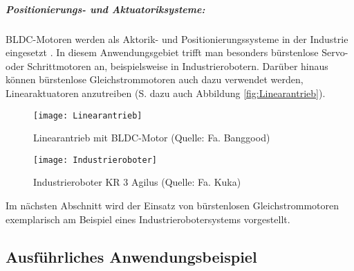 \subparagraph{Positionierungs- und Aktuatoriksysteme:} BLDC-Motoren werden als Aktorik- und Positionierungssysteme in der Industrie eingesetzt \parencite[S. 159]{Gopal2002}. In diesem Anwendungsgebiet trifft man besonders bürstenlose Servo- oder Schrittmotoren an, beispielsweise in Industrierobotern. Darüber hinaus können bürstenlose Gleichstrommotoren auch dazu verwendet werden, Linearaktuatoren anzutreiben \parencite[S. 91]{Zhang2013} (S.  dazu auch Abbildung \ref{fig:Linearantrieb}).

\begin{figure}[h]
  \begin{minipage}{.49\textwidth}
    \centering
    \texttt{[image: Linearantrieb]}
    \caption[Linearantrieb mit BLDC-Motor]{Linearantrieb mit BLDC-Motor (Quelle: Fa. Banggood)}
    \label{fig:Linearantrieb}
  \end{minipage}\hfill%
  \begin{minipage}{.49\textwidth}
    \centering
    \texttt{[image: Industrieroboter]}
    \caption[Industrieroboter KR 3 Agilus]{Industrieroboter KR 3 Agilus (Quelle: Fa. Kuka)}
    \label{fig:Industrieroboter}
  \end{minipage}
\end{figure}

Im nächsten Abschnitt wird der Einsatz von bürstenlosen Gleichstrommotoren exemplarisch am Beispiel eines Industrierobotersystems vorgestellt.

\subsection{Ausführliches Anwendungsbeispiel}

